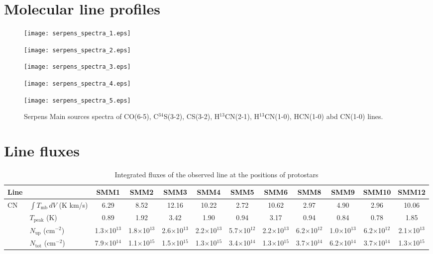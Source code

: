 \documentclass{aa}
\begin{document}
\begin{appendix}
\section{Molecular line profiles}

\begin{figure*} 
\centering 
\texttt{[image: serpens\_spectra\_1.eps]}
\label{Spectra1} 
\end{figure*} 

\begin{figure*} 
\centering
\texttt{[image: serpens\_spectra\_2.eps]} 
\label{Spectra2} 
\end{figure*}

\begin{figure*}
\centering 
\texttt{[image: serpens\_spectra\_3.eps]}
\label{Spectra3} 
\end{figure*} 

\begin{figure*}
\centering 
\texttt{[image: serpens\_spectra\_4.eps]}
\label{Spectra4} 
\end{figure*}

\begin{figure*} 
\centering
\texttt{[image: serpens\_spectra\_5.eps]} 
\caption{Serpens Main sources spectra of CO(6-5), C$^{34}$S(3-2), CS(3-2), H$^{13}$CN(2-1), H$^{13}$CN(1-0),
 HCN(1-0) abd CN(1-0) lines.} 
 \label{Spectra5}
\end{figure*}

\section{Line fluxes}

\begin{sidewaystable*}
\caption{Integrated fluxes of the observed line at the positions of protostars}\label{table:fluxes}
\centering
\begin{tabular}{l l c c c c c c c c c c} 
\hline\hline             
Line &  & SMM1 & SMM2 & SMM3 & SMM4 & SMM5 & SMM6 & SMM8 & SMM9 & SMM10 & SMM12 \\
\hline \multirow{4}{*}{CN} & $\int{T_{\mathrm{mb}} \, dV}$ (K km/s) & 6.29 & 8.52 & 12.16 & 10.22 & 2.72 & 10.62 & 2.97 & 4.90 & 2.96 & 10.06 \\
& $T_\mathrm{peak}$ (K) & 0.89 & 1.92 & 3.42 & 1.90 & 0.94 & 3.17 & 0.94 & 0.84 & 0.78 & 1.85 \\
& $N_\mathrm{up}$ (cm$^{-2}$) & 1.3$\times$10$^{13}$ & 1.8$\times$10$^{13}$ & 2.6$\times$10$^{13}$ & 2.2$\times$10$^{13}$ & 5.7$\times$10$^{12}$ & 2.2$\times$10$^{13}$ & 6.2$\times$10$^{12}$ & 1.0$\times$10$^{13}$ & 6.2$\times$10$^{12}$ & 2.1$\times$10$^{13}$ \\
& $N_\mathrm{tot}$ (cm$^{-2}$) & 7.9$\times$10$^{14}$ & 1.1$\times$10$^{15}$ & 1.5$\times$10$^{15}$ & 1.3$\times$10$^{15}$ & 3.4$\times$10$^{14}$ & 1.3$\times$10$^{15}$ & 3.7$\times$10$^{14}$ & 6.2$\times$10$^{14}$ & 3.7$\times$10$^{14}$ & 1.3$\times$10$^{15}$\\


\end{tabular}
\end{sidewaystable*}
\end{appendix}
\end{document}
